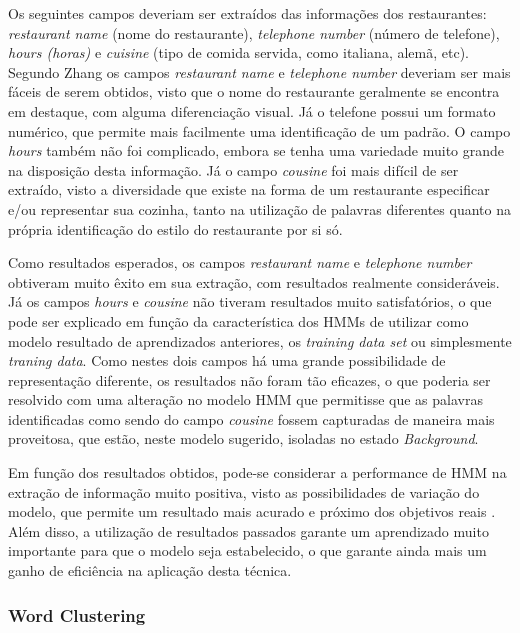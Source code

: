 \begin{textonovo}
Os seguintes campos deveriam ser extraídos das informações dos restaurantes: \textit{restaurant name} (nome do restaurante), \textit{telephone number} (número de telefone), \textit{hours (horas)} e \textit{cuisine} (tipo de comida servida, como italiana, alemã, etc). Segundo Zhang \cite{Zhang-HMM-IE} os campos \textit{restaurant name} e \textit{telephone number} deveriam ser mais fáceis de serem obtidos, visto que o nome do restaurante geralmente se encontra em destaque, com alguma diferenciação visual. Já o telefone possui um formato numérico, que permite mais facilmente uma identificação de um padrão. O campo \textit{hours} também não foi complicado, embora se tenha uma variedade muito grande na disposição desta informação. Já o campo \textit{cousine} foi mais difícil de ser extraído, visto a diversidade que existe na forma de um restaurante especificar e/ou representar sua cozinha, tanto na utilização de palavras diferentes quanto na própria identificação do estilo do restaurante por si só.

Como resultados esperados, os campos \textit{restaurant name} e \textit{telephone number} obtiveram muito êxito em sua extração, com resultados realmente consideráveis. Já os campos \textit{hours} e \textit{cousine} não tiveram resultados muito satisfatórios, o que pode ser  explicado em função da característica dos HMMs de utilizar como modelo resultado de aprendizados anteriores, os \textit{training data set} ou simplesmente \textit{traning data}. Como nestes dois campos há uma grande possibilidade de representação diferente, os resultados não foram tão eficazes, o que poderia ser resolvido com uma alteração no modelo HMM que permitisse que as palavras identificadas como sendo do campo \textit{cousine} fossem capturadas de maneira mais proveitosa, que estão, neste modelo sugerido, isoladas no estado \textit{Background}.

Em função dos resultados obtidos, pode-se considerar a performance de HMM na extração de informação muito positiva, visto as possibilidades de variação do modelo, que permite um resultado mais acurado e próximo dos objetivos reais \cite{Zhang-HMM-IE}. Além disso, a utilização de resultados passados garante um aprendizado muito importante para que o modelo seja estabelecido, o que garante ainda mais um ganho de eficiência na aplicação desta técnica.

\end{textonovo}



\subsubsection{Word Clustering}

